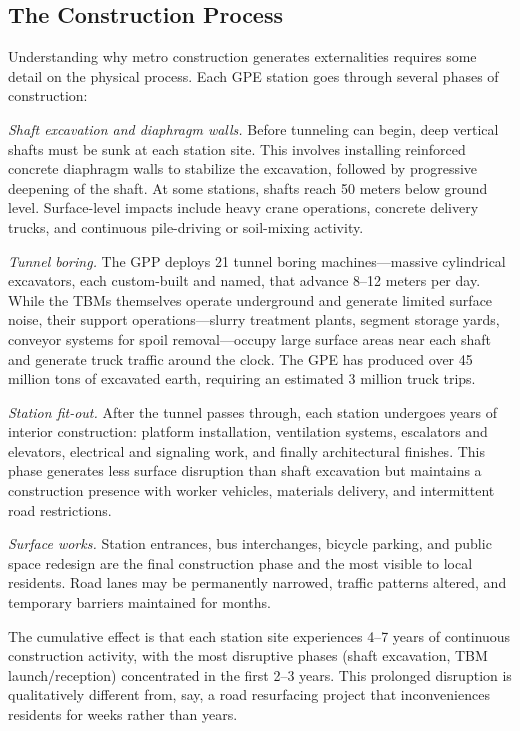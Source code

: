 \documentclass[12pt]{article}
\begin{document}
\subsection{The Construction Process}

Understanding why metro construction generates externalities requires some detail on the physical process. Each GPE station goes through several phases of construction:

\textit{Shaft excavation and diaphragm walls.} Before tunneling can begin, deep vertical shafts must be sunk at each station site. This involves installing reinforced concrete diaphragm walls to stabilize the excavation, followed by progressive deepening of the shaft. At some stations, shafts reach 50 meters below ground level. Surface-level impacts include heavy crane operations, concrete delivery trucks, and continuous pile-driving or soil-mixing activity.

\textit{Tunnel boring.} The GPP deploys 21 tunnel boring machines---massive cylindrical excavators, each custom-built and named, that advance 8--12 meters per day. While the TBMs themselves operate underground and generate limited surface noise, their support operations---slurry treatment plants, segment storage yards, conveyor systems for spoil removal---occupy large surface areas near each shaft and generate truck traffic around the clock. The GPE has produced over 45 million tons of excavated earth, requiring an estimated 3 million truck trips.

\textit{Station fit-out.} After the tunnel passes through, each station undergoes years of interior construction: platform installation, ventilation systems, escalators and elevators, electrical and signaling work, and finally architectural finishes. This phase generates less surface disruption than shaft excavation but maintains a construction presence with worker vehicles, materials delivery, and intermittent road restrictions.

\textit{Surface works.} Station entrances, bus interchanges, bicycle parking, and public space redesign are the final construction phase and the most visible to local residents. Road lanes may be permanently narrowed, traffic patterns altered, and temporary barriers maintained for months.

The cumulative effect is that each station site experiences 4--7 years of continuous construction activity, with the most disruptive phases (shaft excavation, TBM launch/reception) concentrated in the first 2--3 years. This prolonged disruption is qualitatively different from, say, a road resurfacing project that inconveniences residents for weeks rather than years.
\end{document}
